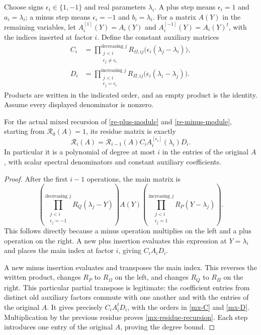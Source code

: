 Choose signs \(\epsilon_i\in\{1,-1\}\) and real parameters
\(\lambda_i\).  A plus step means \(\epsilon_i=1\) and
\(a_i=\lambda_i\); a minus step means \(\epsilon_i=-1\)
and \(b_i=\lambda_i\).  For a matrix \(A(Y)\) in the remaining
variables, let \(A_i^{[1]}(Y)=A_i(Y)\) and
\(A_i^{[-1]}(Y)=A_i(Y)^t\), with the indices inserted at factor
\(i\).  Define the constant auxiliary matrices
\begin{align}
 C_i&=\prod_{\substack{j<i\\\epsilon_j\ne\epsilon_i}}^{\text{decreasing }j}
       R_{\Omega,ij}\bigl(\epsilon_i(\lambda_j-\lambda_i)\bigr),
                                                        \label{mx-C}\\
 D_i&=\prod_{\substack{j<i\\\epsilon_j=\epsilon_i}}^{\text{increasing }j}
       R_{\Pi,ij}\bigl(\epsilon_i(\lambda_i-\lambda_j)\bigr).
                                                        \label{mx-D}
\end{align}
Products are written in the indicated order, and an empty product
is the identity.  Assume every displayed denominator is nonzero.

\begin{lemma}\label{mx-recursion}
For the actual mixed recursion of
\eqref{re-plus-module} and \eqref{re-minus-module}, starting
from \(\mathcal R_0(A)=1\), its residue matrix is exactly
\begin{equation}\label{mx-residue-recursion}
 \mathcal R_i(A)=\mathcal R_{i-1}(A)
                    C_i A_i^{[\epsilon_i]}(\lambda_i)D_i.
\end{equation}
In particular it is a polynomial of degree at most \(i\) in
the entries of the original \(A\), with scalar spectral
denominators and constant auxiliary coefficients.
\end{lemma}

\begin{proof}
After the first \(i-1\) operations, the main matrix is
\[
 \left(\prod_{\substack{j<i\\\epsilon_j=-1}}^{\text{decreasing }j}
                         R_Q(\lambda_j-Y)\right)
 A(Y)
 \left(\prod_{\substack{j<i\\\epsilon_j=1}}^{\text{increasing }j}
                         R_P(Y-\lambda_j)\right).
\]
This follows directly because a minus operation multiplies on the
left and a plus operation on the right.  A new plus insertion
evaluates this expression at \(Y=\lambda_i\) and places the
main index at factor \(i\), giving \(C_i A_i D_i\).

A new minus insertion evaluates and transposes the main index.
This reverses the written product, changes \(R_P\) to
\(R_\Omega\) on the left, and changes \(R_Q\) to
\(R_\Pi\) on the right.  This particular partial transpose is
legitimate: the coefficient entries from distinct old auxiliary
factors commute with one another and with the entries of the
original \(A\).  It gives precisely
\(C_i A_i^tD_i\), with the orders in \eqref{mx-C} and
\eqref{mx-D}.  Multiplication by the previous residue proves
\eqref{mx-residue-recursion}.  Each step introduces one entry of
the original \(A\), proving the degree bound.
\end{proof}

